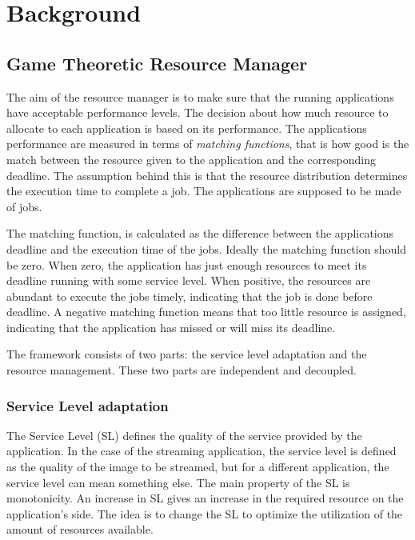 \documentclass[nobiblatex]{LTHthesis}
\begin{document}
\chapter{Background}
\label{chp:background}

\section{Game Theoretic Resource Manager}

The aim of the resource manager is to make sure that the running applications
have acceptable performance levels. The decision about how much resource to
allocate to each application is based on its performance. The applications
performance are measured in terms of \emph{matching functions}, that is how
good is the match between the resource given to the application and the
corresponding deadline. The assumption behind this is that the resource
distribution determines the execution time to complete a job. The applications
are supposed to be made of jobs. 

The matching function, is calculated as the difference between the
applications deadline and the execution time of the jobs. Ideally the matching
function should be zero. When zero, the application has just enough resources
to meet its deadline running with some service level. When positive, the
resources are abundant to execute the jobs timely, indicating that the job
is done before deadline. A negative matching function means that too little
resource is assigned, indicating that the application has missed or will miss
its deadline.

The framework consists of two parts: the service level adaptation and the
resource management. These two parts are independent and decoupled.


\subsection{Service Level adaptation}

The Service Level (SL) defines the quality of the service provided by the 
application. In the case of the streaming application, the service level
is defined as the quality of the image to be streamed, but for a different
application, the service level can mean something else. The main property of
the SL is monotonicity. An increase in SL gives an increase in the required
resource on the application's side. The idea is to change the SL to optimize
the utilization of the amount of resources available. 
\end{document}

